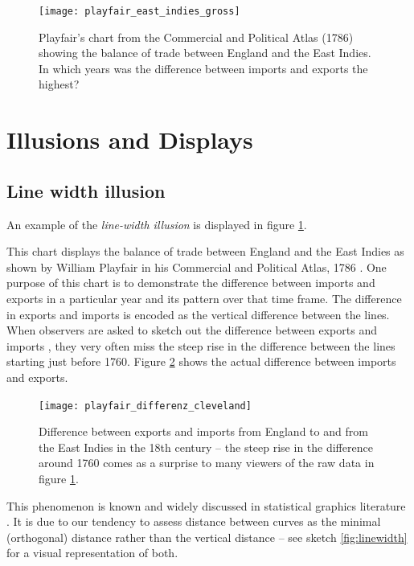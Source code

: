 %


\begin{figure}
\texttt{[image: playfair\_east\_indies\_gross]}
\caption{\label{playfair}
Playfair's chart from the Commercial and Political Atlas (1786) showing the balance of trade between England and the East Indies.  In which years was the difference between imports and exports the highest? }
\end{figure}

\section{Illusions and Displays}
\subsection{Line width illusion}
An example of the  {\it line-width illusion} is displayed in  figure  \ref{playfair}. 


This chart displays the balance of trade between England and the East Indies as shown by William Playfair in his Commercial and Political Atlas, 1786 \cite{playfair, playfair2}.  One purpose of this chart is to demonstrate the difference between imports and exports in a particular year and its pattern over that time frame. The difference in exports and imports is encoded as the vertical difference between the lines. When observers are asked to sketch out the difference between exports and imports  \citep{cleveland:1984}, they very often  miss the steep rise in the difference between the lines starting just before 1760. Figure \ref{playfair2} shows the  actual difference between imports and exports. 



\begin{figure}
\centering
\texttt{[image: playfair\_differenz\_cleveland]}
\caption{\label{playfair2}
Difference between exports and imports from England to and from the East Indies in the 18th century -- the steep rise in the difference around 1760  comes as a surprise to many viewers of the raw data in figure \ref{playfair}.  }
\end{figure}


This phenomenon  is known and widely discussed in statistical graphics literature \citep{wainer:2000, robbins:2005}. It  is due to our  tendency to assess distance between curves as the minimal (orthogonal) distance rather than the  vertical distance -- see sketch \ref{fig:linewidth} for a visual representation of both.


